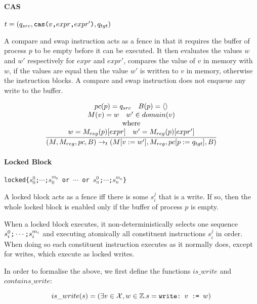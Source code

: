 \documentclass[a4paper]{article}
\begin{document}
\paragraph{CAS} $t = (q_{src},\verb+cas(+v\verb+,+expr\verb+,+expr'\verb+)+,q_{tgt})$

A compare and swap instruction acts as a fence in that it requires the
buffer of process $p$ to be empty before it can be executed. It then
evaluates the values $w$ and $w'$ respectively for $expr$ and $expr'$,
compares the value of $v$ in memory with $w$, if the values are equal
then the value $w'$ is written to $v$ in memory, otherwise the
instruction blocks. A compare and swap instruction does not enqueue
any write to the buffer.

\begin{displaymath}
  \frac{
    \begin{array}{c}
      \pc(p) = q_{src} \sep \buf(p) = \langle\rangle\\
      \mem(v) = w \sep w' \in domain(v)\\
      \textrm{where}\\
      w = \regval(p)[expr] \sep w' = \regval(p)[expr']\\
    \end{array}
  }{(\mem,\regval,\pc,\buf) \rightarrow_t (\mem[v:=w'],\regval,\pc[p:=q_{tgt}],\buf)}
\end{displaymath}

\paragraph{Locked Block}
\verb+locked{+$s_0^0$\verb+;+$\cdots$\verb+;+$s_0^{m_0}$\verb+ or +$\cdots$\verb+ or +$s_n^0$\verb+;+$\cdots$\verb+;+$s_n^{m_n}$\verb+}+

A locked block acts as a fence iff there is some $s_i^j$ that is a
write. If so, then the whole locked block is enabled only if the
buffer of process $p$ is empty. 

When a locked block executes, it non-deterministically selects one
sequence $s_i^0\verb+;+\cdots\verb+;+s_i^{m_i}$ and executing atomically
all constituent instructions $s_i^j$ in order. When doing so each
constituent instruction executes as it normally does, except for
writes, which execute as locked writes.

In order to formalise the above, we first define the functions $is\_write$ and $contains\_write$:

\begin{displaymath}
  is\_write(s) = \left(\exists v\in\vars, w\in\mathbb{Z} . s = \verb+write: +v\verb+ := +w\right)
\end{displaymath}
\end{document}
